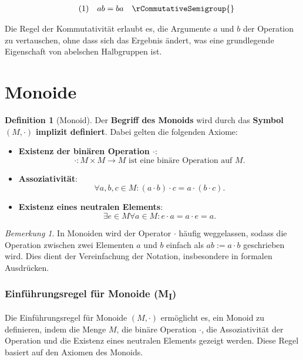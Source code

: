 \documentclass{book}
\theoremstyle{plain}
\theoremstyle{remark}
\newtheorem*{remark}{Bemerkung}
\theoremstyle{definition}
\newtheorem{definition}{Definition}[section]
\begin{document}
\[
\begin{array}{llll}
          & (1) & ab = ba & \rCommutativeSemigroup{} \\
\end{array}
\]


Die Regel der Kommutativität erlaubt es, die Argumente \(a\) und \(b\) der Operation zu vertauschen, ohne dass sich das Ergebnis ändert, was eine grundlegende Eigenschaft von abelschen Halbgruppen ist.

\section{Monoide}

\begin{definition}[Monoid]
    Der \textbf{Begriff des Monoids} wird durch das \textbf{Symbol} \((M, \cdot)\) \textbf{implizit definiert}. Dabei gelten die folgenden Axiome:
    
    \begin{itemize}
        \item \textbf{Existenz der binären Operation \(\cdot\)}:
        \[
        \cdot \colon M \times M \to M \text{ ist eine binäre Operation auf } M.
        \]
        
        \item \textbf{Assoziativität}: 
        \[
        \forall a, b, c \in M \colon (a \cdot b) \cdot c = a \cdot (b \cdot c).
        \]
        
        \item \textbf{Existenz eines neutralen Elements}:
        \[
        \exists e \in M\forall a \in M \colon e \cdot a = a \cdot e = a.
        \]
    \end{itemize}
\end{definition}

\begin{remark}
    In Monoiden wird der Operator \(\cdot\) häufig weggelassen, sodass die Operation zwischen zwei Elementen \(a\) und \(b\) einfach als \(ab := a \cdot b\) geschrieben wird. Dies dient der Vereinfachung der Notation, insbesondere in formalen Ausdrücken.
\end{remark}

\subsubsection*{Einführungsregel für Monoide (M\textsubscript{I})}
\label{rule:rMonoidI}
Die Einführungsregel für Monoide \((M, \cdot)\) ermöglicht es, ein Monoid zu definieren, indem die Menge \(M\), die binäre Operation \(\cdot\), die Assoziativität der Operation und die Existenz eines neutralen Elements gezeigt werden. Diese Regel basiert auf den Axiomen des Monoids.
\end{document}
